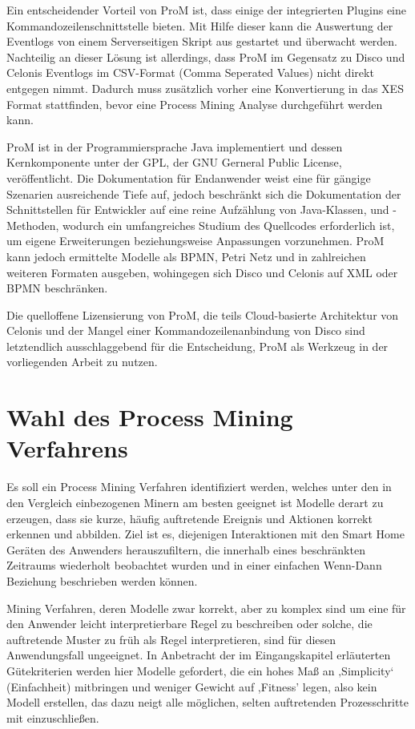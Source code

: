 Ein entscheidender Vorteil von ProM ist, dass einige der integrierten Plugins eine Kommandozeilenschnittstelle bieten. Mit Hilfe dieser kann die Auswertung der Eventlogs von einem Serverseitigen Skript aus gestartet und überwacht werden. Nachteilig an dieser Lösung ist allerdings, dass ProM im Gegensatz zu Disco und Celonis Eventlogs im CSV-Format (Comma Seperated Values) nicht direkt entgegen nimmt. Dadurch muss zusätzlich vorher eine Konvertierung in das XES Format stattfinden, bevor eine Process Mining Analyse durchgeführt werden kann.

ProM ist in der Programmiersprache Java implementiert und dessen Kernkomponente unter der GPL, der GNU  Gerneral Public License,  veröffentlicht. Die Dokumentation für Endanwender weist eine für gängige Szenarien ausreichende Tiefe auf, jedoch beschränkt sich die Dokumentation der Schnittstellen für Entwickler auf eine reine Aufzählung von Java-Klassen, und -Methoden, wodurch ein umfangreiches Studium des Quellcodes erforderlich ist, um eigene Erweiterungen beziehungsweise Anpassungen vorzunehmen. ProM kann jedoch ermittelte Modelle als BPMN, Petri Netz und in zahlreichen weiteren Formaten ausgeben, wohingegen sich Disco und Celonis auf XML oder BPMN beschränken. 

Die quelloffene Lizensierung von ProM, die teils Cloud-basierte Architektur von Celonis und der Mangel einer Kommandozeilenanbindung von Disco sind letztendlich ausschlaggebend für die Entscheidung, ProM als Werkzeug in der vorliegenden Arbeit zu nutzen. 

\newpage
\section{Wahl des Process Mining Verfahrens}

Es soll ein Process Mining Verfahren identifiziert werden, welches unter den in den Vergleich einbezogenen Minern am besten geeignet ist Modelle derart zu erzeugen, dass sie kurze, häufig auftretende Ereignis und Aktionen korrekt erkennen und abbilden. Ziel ist es, diejenigen Interaktionen mit den Smart Home Geräten des Anwenders herauszufiltern, die innerhalb eines beschränkten Zeitraums wiederholt beobachtet wurden und in einer einfachen Wenn-Dann Beziehung beschrieben werden können. 

Mining Verfahren, deren Modelle zwar korrekt, aber zu komplex sind um eine für den Anwender leicht interpretierbare Regel zu beschreiben oder solche, die auftretende Muster zu früh als Regel interpretieren, sind für diesen Anwendungsfall ungeeignet. In Anbetracht der im Eingangskapitel erläuterten Gütekriterien werden hier Modelle gefordert, die ein hohes Maß an ‚Simplicity‘ (Einfachheit) mitbringen und weniger Gewicht auf ,Fitness' legen, also kein Modell erstellen, das dazu neigt alle möglichen, selten auftretenden Prozesschritte mit einzuschließen. 

